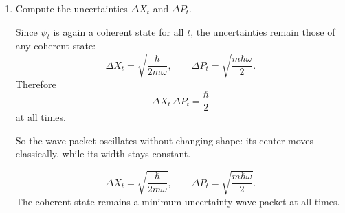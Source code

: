 \documentclass[11pt,a4paper]{scrartcl}
\begin{document}
\begin{enumerate}[label=(\alph*)]
\begin{calculationbox}
    Write
    \[
    \alpha_0 = |\alpha_0|e^{i\varphi}.
    \]
    Then
    \[
    \alpha_t=|\alpha_0|e^{i(\varphi-\omega t)}.
    \]
    Hence
    \[
    \boxed{
    \langle X\rangle_t=
    \sqrt{\frac{2\hbar}{m\omega}}\,|\alpha_0|\cos(\omega t-\varphi)
    }
    \]
    and
    \[
    \boxed{
    \langle P\rangle_t=
    -\sqrt{2m\hbar\omega}\,|\alpha_0|\sin(\omega t-\varphi).
    }
    \]

    These are exactly the classical solutions for a harmonic oscillator:
    \[
    x_{\mathrm{cl}}(t)=A\cos(\omega t-\varphi),\qquad
    p_{\mathrm{cl}}(t)=m\dot x_{\mathrm{cl}}(t),
    \]
    with amplitude
    \[
    A=\sqrt{\frac{2\hbar}{m\omega}}\,|\alpha_0|.
    \]

    The energy expectation value is
    \[
    \langle H\rangle_t
    =
    \hbar\omega\left(|\alpha_t|^2+\frac12\right).
    \]
    Since $|\alpha_t|=|\alpha_0|$, this is constant:
    \[
    \boxed{
    \langle H\rangle_t=\hbar\omega\left(|\alpha_0|^2+\frac12\right).
    }
    \]

    The classical harmonic oscillator energy is also conserved. Thus the expectation values of $X$ and $P$ follow the classical trajectory exactly, while the energy remains constant.
    \end{calculationbox}

    \begin{answerbox}
    \[
    \boxed{
    \langle X\rangle_t=
    \sqrt{\frac{2\hbar}{m\omega}}\Re(\alpha_0 e^{-i\omega t}),
    \qquad
    \langle P\rangle_t=
    \sqrt{2m\hbar\omega}\Im(\alpha_0 e^{-i\omega t}),
    }
    \]
    and
    \[
    \boxed{
    \langle H\rangle_t=\hbar\omega\left(|\alpha_0|^2+\frac12\right).
    }
    \]
    The position and momentum expectation values follow the classical harmonic motion exactly.
    \end{answerbox}

    \item Compute the uncertainties $\Delta X_t$ and $\Delta P_t$.

    \begin{solutionbox}
    Since $\psi_t$ is again a coherent state for all $t$, the uncertainties remain those of any coherent state:
    \[
    \Delta X_t=\sqrt{\frac{\hbar}{2m\omega}},
    \qquad
    \Delta P_t=\sqrt{\frac{m\hbar\omega}{2}}.
    \]
    Therefore
    \[
    \Delta X_t\,\Delta P_t=\frac{\hbar}{2}
    \]
    at all times.

    So the wave packet oscillates without changing shape: its center moves classically, while its width stays constant.
    \end{solutionbox}

    \begin{answerbox}
    \[
    \boxed{
    \Delta X_t=\sqrt{\frac{\hbar}{2m\omega}},
    \qquad
    \Delta P_t=\sqrt{\frac{m\hbar\omega}{2}}.
    }
    \]
    The coherent state remains a minimum-uncertainty wave packet at all times.
    \end{answerbox}
\end{enumerate}
\end{document}
